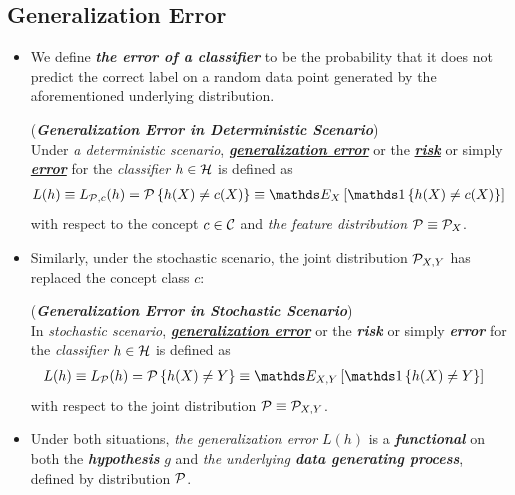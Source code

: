 \documentclass[11pt]{article}
\begin{document}
\subsection{Generalization Error}
\begin{itemize}
\item We define \emph{\textbf{the error of a classifier}} to be the probability that it does not predict the correct label on a random data point generated by the
aforementioned underlying distribution.
\begin{definition} (\emph{\textbf{Generalization Error in Deterministic Scenario}})  \citep{mohri2018foundations}\\
Under \emph{a deterministic scenario}, \underline{\emph{\textbf{generalization error}}} or the \underline{\emph{\textbf{risk}}} or simply \underline{\emph{\textbf{error}}} for the \emph{classifier} $h \in {\mathcal H}$ is defined as
\begin{align}
L(h) \equiv L_{\cP, c}(h)  &= \cP\set{h(X) \neq c(X)} \equiv \E{X}{\ind{h(X)\neq c(X)}}\label{expr: gen_err_determin}
\end{align}
with respect to the concept $c \in {\mathcal C}$ and \emph{the feature distribution} ${\mathcal P} \equiv {\mathcal P}_X$.
\end{definition}

\item Similarly, under the stochastic scenario, the joint distribution ${\mathcal P}_{X, Y}$ has replaced the concept class $c$:
\begin{definition} (\emph{\textbf{Generalization Error in Stochastic Scenario}})  \citep{mohri2018foundations}\\
In \emph{stochastic scenario}, \underline{\emph{\textbf{generalization error}}} or the \emph{\textbf{risk}} or simply \emph{\textbf{error}} for the \emph{classifier} $h \in {\mathcal H}$ is defined as
\begin{align}
L(h) \equiv  L_{\cP}(h) &= \cP\set{h(X) \neq Y}\equiv \E{X, Y}{\ind{h(X)\neq Y}} \label{expr: gen_err_gener}
\end{align} with respect to the joint distribution ${\mathcal P} \equiv {\mathcal P}_{X, Y}$.
\end{definition}

\item \begin{remark}
Under both situations, \emph{the generalization error} $L(h)$ is a \emph{\textbf{functional}} on both the \emph{\textbf{hypothesis}} $g$ and \emph{the underlying \textbf{data generating process}}, defined by distribution ${\mathcal P}$.
\end{remark}
\end{itemize}
\end{document}
